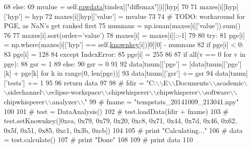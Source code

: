 \begin{DoxyCode}
68                     \textcolor{keywordflow}{else}:
69                         mvalue = self.\hyperlink{classsoftware_1_1chipwhisperer_1_1analyzer_1_1attacks_1_1__data__analysis_1_1DataAnalysis_a6f5e5781d17b950cb00eb4ce0177a2b5}{rawdata}[tindex][\textcolor{stringliteral}{"diffsmax"}][i][hyp]
70 
71                     maxes[i][hyp][\textcolor{stringliteral}{'hyp'}] = hyp
72                     maxes[i][hyp][\textcolor{stringliteral}{'value'}] = mvalue
73 
74                     \textcolor{comment}{# TODO: workaround for PGE, as NaN's get ranked first}
75                     numnans = np.isnan(maxes[i][\textcolor{stringliteral}{'value'}]).sum()
76 
77                     maxes[i].sort(order=\textcolor{stringliteral}{'value'})
78                     maxes[i] = maxes[i][::-1]
79 
80                     \textcolor{keywordflow}{try}:
81                         pge[i] = np.where(maxes[i][\textcolor{stringliteral}{'hyp'}] == self.\hyperlink{classsoftware_1_1chipwhisperer_1_1analyzer_1_1attacks_1_1__data__analysis_1_1DataAnalysis_a207516056735e3966c24a7eb2d2e836a}{knownkey}[i])[0][0] - numnans
82                         \textcolor{keywordflow}{if} pge[i] < 0:
83                             pge[i] = 128
84                     \textcolor{keywordflow}{except} IndexError:
85                         pge[i] = 255
86 
87             \textcolor{keywordflow}{if} all(v == 0 \textcolor{keywordflow}{for} v \textcolor{keywordflow}{in} pge):
88                 gsr = 1
89             \textcolor{keywordflow}{else}:
90                 gsr = 0
91 
92             data[tnum][\textcolor{stringliteral}{'pge'}] = [data[tnum][\textcolor{stringliteral}{'pge'}][k] + pge[k] \textcolor{keywordflow}{for} k \textcolor{keywordflow}{in} range(0, len(pge))]
93             data[tnum][\textcolor{stringliteral}{'gsr'}] += gsr
94             data[tnum][\textcolor{stringliteral}{'tests'}] += 1
95 
96         \textcolor{keywordflow}{return} data
97 
98 \textcolor{comment}{# fdir =
       "C:\(\backslash\)\(\backslash\)E\(\backslash\)\(\backslash\)Documents\(\backslash\)\(\backslash\)academic\(\backslash\)\(\backslash\)sidechannel\(\backslash\)\(\backslash\)eclipse-workspace\(\backslash\)\(\backslash\)chipwhisperer\(\backslash\)\(\backslash\)chipwhisperer\(\backslash\)\(\backslash\)software\(\backslash\)\(\backslash\)chipwhisperer\(\backslash\)\(\backslash\)analyzer\(\backslash\)\(\backslash\)"}
99 \textcolor{comment}{# fname = "tempstats\_20141009\_213041.npy"}
100 
101 \textcolor{comment}{# test = DataAnalysis()}
102 \textcolor{comment}{# test.loadData(fdir + fname)}
103 \textcolor{comment}{# test.setKnownkey([0xea, 0x79, 0x79, 0x20, 0xc8, 0x71, 0x44, 0x7d, 0x46, 0x62, 0x5f, 0x51, 0x85, 0xc1,
       0x3b, 0xcb])}
104 
105 \textcolor{comment}{# print "Calculating..."}
106 \textcolor{comment}{# data = test.calculate()}
107 \textcolor{comment}{# print "Done"}
108 
109 \textcolor{comment}{# print data}
110 \end{DoxyCode}
